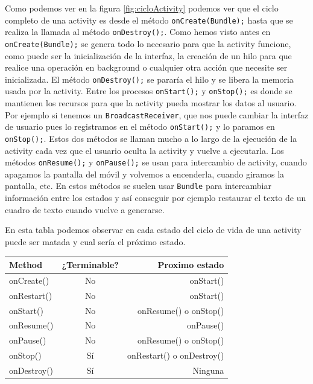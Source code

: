 \begin{itemize}
Como podemos ver en la figura \ref{fig:cicloActivity} podemos ver que el ciclo completo de una activity es desde el método \lstinline{onCreate(Bundle);} hasta que se realiza la llamada al método \lstinline{onDestroy();}. Como hemos visto antes en \lstinline{onCreate(Bundle);} se genera todo lo necesario para que la activity funcione, como puede ser la inicialización de la interfaz, la creación de un hilo para que realice una operación en background o cualquier otra acción que necesite ser inicializada. El método \lstinline{onDestroy();} se pararía el hilo y se libera la memoria usada por la activity. Entre los procesos \lstinline{onStart();} y \lstinline{onStop();} es donde se mantienen los recursos para que la activity pueda mostrar los datos al usuario. Por ejemplo si tenemos un \lstinline{BroadcastReceiver}, que nos puede cambiar la interfaz de usuario pues lo registramos en el método \lstinline{onStart();} y lo paramos en \lstinline{onStop();}. Estos dos métodos se llaman mucho a lo largo de la ejecución de la activity cada vez que el usuario oculta la activity y vuelve a ejecutarla. Los métodos \lstinline{onResume();} y \lstinline{onPause();} se usan para intercambio de activity, cuando apagamos la pantalla del móvil y volvemos a encenderla, cuando giramos la pantalla, etc. En estos métodos se suelen usar \lstinline{Bundle} para intercambiar información entre los estados y así conseguir por ejemplo restaurar el texto de un cuadro de texto cuando vuelve a generarse.

En esta tabla podemos observar en cada estado del ciclo de vida de una activity puede ser matada y cual sería el próximo estado.
\begin{center}
\begin{tabular}{|l | c | r|}

\hline
Method & ¿Terminable? & Proximo estado\\
\hline
onCreate() & No & onStart()\\
\hline
onRestart() & No & onStart()\\
\hline
onStart() & No & onResume() o onStop()\\
\hline
onResume() & No & onPause()\\
\hline
onPause() & No  & onResume() o onStop()\\
\hline
onStop() & Sí & onRestart() o onDestroy()\\
\hline
onDestroy() & Sí & Ninguna\\
\hline

\end{tabular}
\end{center}


\end{itemize}
